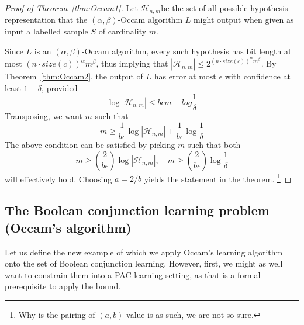 \begin{proof}[Proof of Theorem~\ref{thm:Occam1}]
    Let $\mathcal{H}_{n,m}$be the set of all possible hypothesis representation that the $(\alpha,\beta)$-Occam algorithm $L$ might output when given as input a labelled sample $S$ of cardinality $m$. 

    Since $L$ is an $(\alpha,\beta)$-Occam algorithm, every such hypothesis has bit length at most $(n\cdot size(c))^{\alpha}m^{\beta}$, thus implying that $|\mathcal{H}_{n,m}|\leq 2^{(n\cdot size(c))^{\alpha}m^{\beta}}$. By Theorem~\ref{thm:Occam2}, the output of $L$ has error at most $\epsilon$ with confidence at least $1-\delta$, provided 
    \begin{equation}
        \log{|\mathcal{H}_{n,m}|} \leq b\epsilon m - log{\frac{1}{\delta}}
    \end{equation}
    Transposing, we want $m$ such that 
    \begin{equation}
        m\geq \frac{1}{b\epsilon} \log{|\mathcal{H}_{n,m}|} + \frac{1}{b\epsilon}\log{\frac{1}{\delta}}
    \end{equation}
    The above condition can be satisfied by picking $m$ such that both \begin{equation}
        m\geq \left(\frac{2}{b\epsilon}\right) \log{|\mathcal{H}_{n,m}|} , \quad m \geq \left(\frac{2}{b\epsilon}\right) \log{\frac{1}{\delta}}
    \end{equation}
    will effectively hold. Choosing $a=2/b$ yields the statement in the theorem. \footnote{Why is the pairing of $(a,b)$ value is as such, we are not so sure.}
\end{proof}

\subsection{The Boolean conjunction learning problem (Occam's algorithm)}

Let us define the new example of which we apply Occam's learning algorithm onto the set of Boolean conjunction learning. However, first, we might as well want to constrain them into a PAC-learning setting, as that is a formal prerequisite to apply the bound. 

